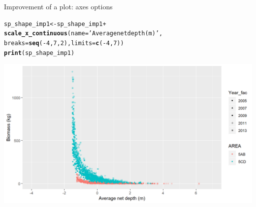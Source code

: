 \documentclass{beamer}\usepackage[]{graphicx}\usepackage[]{color}
\makeatletter
\newcommand{\hlnum}[1]{\textcolor[rgb]{0.686,0.059,0.569}{#1}}%
\newcommand{\hlstr}[1]{\textcolor[rgb]{0.192,0.494,0.8}{#1}}%
\newcommand{\hlopt}[1]{\textcolor[rgb]{0,0,0}{#1}}%
\newcommand{\hlstd}[1]{\textcolor[rgb]{0.345,0.345,0.345}{#1}}%
\newcommand{\hlkwb}[1]{\textcolor[rgb]{0.69,0.353,0.396}{#1}}%
\newcommand{\hlkwc}[1]{\textcolor[rgb]{0.333,0.667,0.333}{#1}}%
\newcommand{\hlkwd}[1]{\textcolor[rgb]{0.737,0.353,0.396}{\textbf{#1}}}%
\newenvironment{kframe}{%
 \def\at@end@of@kframe{}%
 \ifinner\ifhmode%
  \def\at@end@of@kframe{\end{minipage}}%
  \begin{minipage}{\columnwidth}%
 \fi\fi%
 \def\FrameCommand##1{\hskip\@totalleftmargin \hskip-\fboxsep
 \colorbox{shadecolor}{##1}\hskip-\fboxsep
     \hskip-\linewidth \hskip-\@totalleftmargin \hskip\columnwidth}%
 \MakeFramed {\advance\hsize-\width
   \@totalleftmargin\z@ \linewidth\hsize
   \@setminipage}}%
 {\par\unskip\endMakeFramed%
 \at@end@of@kframe}
\newenvironment{knitrout}{}{} %
\makeatother
\begin{document}
\begin{frame}[fragile]{Improvement of a plot: axes options}
\begin{knitrout}\footnotesize
{}\color{fgcolor}\begin{kframe}
\begin{alltt}
\hlstd{sp_shape_imp1} \hlkwb{<-} \hlstd{sp_shape_imp1} \hlopt{+}
  \hlkwd{scale_x_continuous}\hlstd{(}\hlkwc{name}\hlstd{=}\hlstr{'Average net depth (m)'}\hlstd{,}
                     \hlkwc{breaks}\hlstd{=}\hlkwd{seq}\hlstd{(}\hlopt{-}\hlnum{4}\hlstd{,}\hlnum{7}\hlstd{,}\hlnum{2}\hlstd{),} \hlkwc{limits}\hlstd{=}\hlkwd{c}\hlstd{(}\hlopt{-}\hlnum{4}\hlstd{,}\hlnum{7}\hlstd{))}
\hlkwd{print}\hlstd{(sp_shape_imp1)}
\end{alltt}
\end{kframe}

{\centering \includegraphics[width=.9\linewidth]{figure/sp_shape_imp1x-1} 

}



\end{knitrout}
\end{frame}
\end{document}
